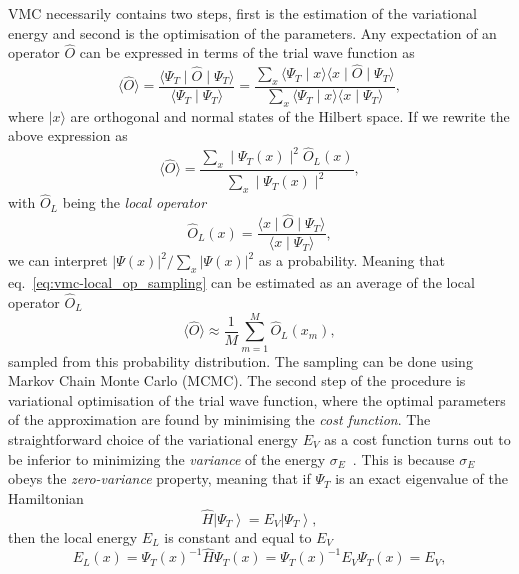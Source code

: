 VMC necessarily contains two steps, first is the estimation of the variational energy and second is the optimisation of the parameters. Any expectation of an operator $\hat{O}$ can be expressed in terms of the trial wave function as
\begin{equation}
	\langle\hat{O}\rangle=\frac{\langle\Psi_{T}\mid\hat{O}\mid \Psi_{T}\rangle}{\langle\Psi_{T} \mid \Psi_{T}\rangle}=\frac{\sum_{x}\langle\Psi_{T} \mid x\rangle\langle x\mid\hat{O}\mid \Psi_{T}\rangle}{\sum_{x}\langle\Psi_{T} \mid x\rangle\langle x \mid \Psi_{T}\rangle},
\end{equation}
where $\mid x \rangle$ are orthogonal and normal states of the Hilbert space. If we rewrite the above expression as 
\begin{equation}
	\label{eq:vmc-local_op_sampling}
	\langle \hat{O} \rangle = \frac{\sum_{x}\mid\Psi_{T}(x)\mid^{2} \hat{O}_{L}(x)}{\sum_{x}\mid\Psi_{T}(x)\mid^{2}},
\end{equation}
with $\hat{O}_L$ being the \emph{local operator}
\begin{equation}
	\hat{O}_{L}(x)=\frac{\langle x\mid\hat{O}\mid \Psi_{T}\rangle}{\langle x \mid \Psi_{T}\rangle}, 
\end{equation}
	we can interpret $|\Psi(x)|^{2}/\sum_{x}|\Psi(x)|^{2}$ as a probability. Meaning that eq.~\eqref{eq:vmc-local_op_sampling} can be estimated as an average of the local operator $\hat{O}_L$
\begin{equation}
	\langle\hat{O}\rangle \approx \frac{1}{M} \sum_{m=1}^{M} \hat{O}_{L}\left(x_{m}\right),
\end{equation}
sampled from this probability distribution. The sampling can be done using Markov Chain Monte Carlo (MCMC). The second step of the procedure is variational optimisation of the trial wave function, where the optimal parameters of the approximation are found by minimising the \emph{cost function}. The straightforward choice of the variational energy $E_V$ as a cost function turns out to be inferior to minimizing the \emph{variance} of the energy $\sigma_E$~\cite{foulkes2001quantum}. This is because $\sigma_E$ obeys the \emph{zero-variance} property, meaning that if $\Psi_{T}$ is an exact eigenvalue of the Hamiltonian
\begin{equation}
	\hat{H}\left|\Psi_{T}\right\rangle=E_{V}\left|\Psi_{T}\right\rangle,
\end{equation}
then the local energy $E_L$ is constant and equal to $E_V$
\begin{equation}
	E_{L}(x)=\Psi_{T}(x)^{-1} \hat{H} \Psi_{T}(x)=\Psi_{T}(x)^{-1} E_{V} \Psi_{T}(x)=E_{V},
\end{equation}
